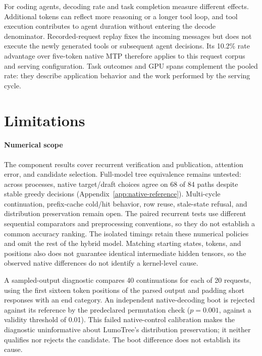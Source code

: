 \documentclass[conference]{IEEEtran}
\newcommand{\sys}{LumoTree}
\begin{document}
For coding agents, decoding rate and task completion measure different effects. Additional tokens can reflect more reasoning or a longer tool loop, and tool execution contributes to agent duration without entering the decode denominator. Recorded-request replay fixes the incoming messages but does not execute the newly generated tools or subsequent agent decisions. Its 10.2\% rate advantage over five-token native MTP therefore applies to this request corpus and serving configuration. Task outcomes and GPU spans complement the pooled rate: they describe application behavior and the work performed by the serving cycle.

\section{Limitations}
\label{sec:limitations}
\paragraph{Numerical scope}
The component results cover recurrent verification and publication, attention error, and candidate selection. Full-model tree equivalence remains untested: across processes, native target/draft choices agree on 68 of 84 paths despite stable greedy decisions (Appendix~\ref{app:native-reference}). Multi-cycle continuation, prefix-cache cold/hit behavior, row reuse, stale-state refusal, and distribution preservation remain open. The paired recurrent tests use different sequential comparators and preprocessing conventions, so they do not establish a common accuracy ranking. The isolated timings retain these numerical policies and omit the rest of the hybrid model. Matching starting states, tokens, and positions also does not guarantee identical intermediate hidden tensors, so the observed native differences do not identify a kernel-level cause.

A sampled-output diagnostic compares 40 continuations for each of 20 requests, using the first sixteen token positions of the parsed output and padding short responses with an end category. An independent native-decoding boot is rejected against its reference by the predeclared permutation check ($p=0.001$, against a validity threshold of 0.01). This failed native-control calibration makes the diagnostic uninformative about \sys{}'s distribution preservation; it neither qualifies nor rejects the candidate. The boot difference does not establish its cause.
\end{document}
